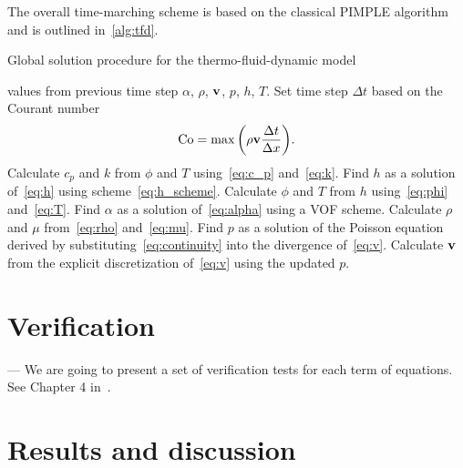 \documentclass{article}
\newcommand{\bv}{\vb{v}}
\begin{document}
The overall time-marching scheme is based on the classical PIMPLE algorithm
and is outlined in~\ref{alg:tfd}.

\begin{algorithm}[H]
\caption{Global solution procedure for the thermo-fluid-dynamic model}\label{alg:tfd}
\begin{algorithmic}[1]
    \Require values from previous time step $\alpha$, $\rho$, $\bv$, $p$, $h$, $T$.
    \State Set time step $\Delta{t}$ based on the Courant number
    \begin{equation}\label{eq:Courant}
        \mathrm{Co} = \max\qty( \rho\bv\frac{\Delta t}{\Delta x} ).
    \end{equation}
    \State Calculate $c_p$ and $k$ from $\phi$ and $T$ using~\eqref{eq:c_p} and~\eqref{eq:k}.
    \State Find $h$ as a solution of~\eqref{eq:h} using scheme~\eqref{eq:h_scheme}.
    \State Calculate $\phi$ and $T$ from $h$ using~\eqref{eq:phi} and~\eqref{eq:T}.
        \State Find $\alpha$ as a solution of~\eqref{eq:alpha} using a VOF scheme.
        \State Calculate $\rho$ and $\mu$ from~\eqref{eq:rho} and~\eqref{eq:mu}.
            \State Find $p$ as a solution of the Poisson equation derived by substituting~\eqref{eq:continuity}
            into the divergence of~\eqref{eq:v}.
            \State Calculate $\bv$ from the explicit discretization of~\eqref{eq:v} using the updated $p$.
        \EndWhile
    \EndWhile
\end{algorithmic}
\end{algorithm}

\section{Verification}

--- We are going to present a set of verification tests for each term of equations. See Chapter 4 in~\cite{attar2011simulation}.

\section{Results and discussion}
\end{document}
